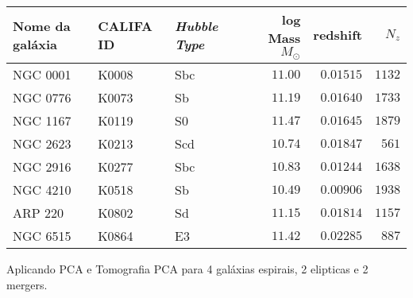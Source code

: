 \begin{table}
	\caption[Relação de galáxias do CALIFA usadas neste trabalho.]
	{}
	\begin{tabular}{l l l r r r}
		Nome da galáxia & CALIFA ID & {\em Hubble Type} & log Mass $M_\odot$ & redshift & $N_z$ \\
		\midrule
		NGC 0001 & K0008 & Sbc & $11.00$ & $0.01515$ & $1132$ \\
		NGC 0776 & K0073 & Sb  & $11.19$ & $0.01640$ & $1733$ \\
		NGC 1167 & K0119 & S0  & $11.47$ & $0.01645$ & $1879$ \\
		NGC 2623 & K0213 & Scd & $10.74$ & $0.01847$ & $561$  \\
		NGC 2916 & K0277 & Sbc & $10.83$ & $0.01244$ & $1638$ \\
		NGC 4210 & K0518 & Sb  & $10.49$ & $0.00906$ & $1938$ \\
		ARP 220  & K0802 & Sd  & $11.15$ & $0.01814$ & $1157$ \\
		NGC 6515 & K0864 & E3  & $11.42$ & $0.02285$ & $887$  \\
	\end{tabular}
	\label{tab:amostraGalaxias}
\end{table}

\ojo
Aplicando PCA e Tomografia PCA para 4 galáxias espirais, 2 elipticas e 2 mergers.

